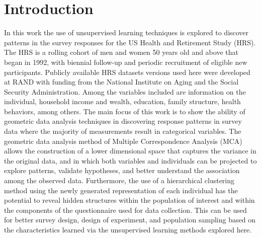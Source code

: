 \documentclass[conference,final,]{IEEEtran}
\begin{document}
\maketitle


%
\IEEEpeerreviewmaketitle


\hypertarget{introduction}{%
\section{Introduction}\label{introduction}}

In this work the use of unsupervised learning techniques is explored to
discover patterns in the survey responses for the US Health and
Retirement Study (HRS). The HRS is a rolling cohort of men and women 50
years old and above that began in 1992, with biennial follow-up and
periodic recruitment of eligible new participants. Publicly available
HRS datasets versions used here were developed at RAND with funding from
the National Institute on Aging and the Social Security Administration.
Among the variables included are information on the individual,
household income and wealth, education, family structure, health
behaviors, among others. The main focus of this work is to show the
ability of geometric data analysis techniques in discovering response
patterns in survey data where the majority of measurements result in
categorical variables. The geometric data analysis method of Multiple
Correspondence Analysis (MCA) allows the construction of a lower
dimensional space that captures the variance in the original data, and
in which both variables and individuals can be projected to explore
patterns, validate hypotheses, and better understand the association
among the observed data. Furthermore, the use of a hierarchical
clustering method using the newly generated representation of each
individual has the potential to reveal hidden structures within the
population of interest and within the components of the questionnaire
used for data collection. This can be used for better survey design,
design of experiment, and population sampling based on the
characteristics learned via the unsupervised learning methods explored
here.
\end{document}
